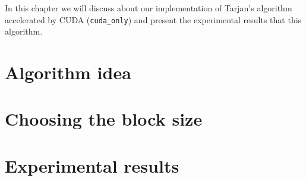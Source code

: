 \label{ch:3}
In this chapter we will discuss about our implementation of Tarjan's algorithm accelerated by CUDA (\verb|cuda_only|) and present the experimental results that this algorithm.

\section{Algorithm idea}


\section{Choosing the block size}


\section{Experimental results}
